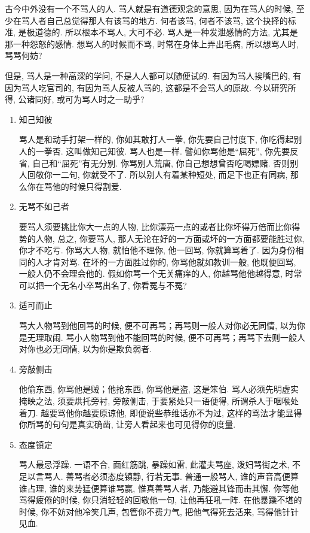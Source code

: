 
古今中外没有一个不骂人的人. 骂人就是有道德观念的意思, 因为在骂人的时候, 至少在骂人者自己总觉得那人有该骂的地方. 何者该骂, 何者不该骂, 这个抉择的标准, 是极道德的. 所以根本不骂人, 大可不必. 骂人是一种发泄感情的方法, 尤其是那一种怨怒的感情. 想骂人的时候而不骂, 时常在身体上弄出毛病, 所以想骂人时, 骂骂何妨? 

但是, 骂人是一种高深的学问, 不是人人都可以随便试的. 有因为骂人挨嘴巴的, 有因为骂人吃官司的, 有因为骂人反被人骂的, 这都是不会骂人的原故. 今以研究所得, 公诸同好, 或可为骂人时之一助乎? 

\begin{enumerate}

\item 知己知彼

骂人是和动手打架一样的, 你如其敢打人一拳, 你先要自己忖度下, 你吃得起别人的一拳否. 这叫做知己知彼. 骂人也是一样. 譬如你骂他是“屈死”, 你先要反省, 自己和“屈死”有无分别. 你骂别人荒唐, 你自己想想曾否吃喝嫖赌. 否则别人回敬你一二句, 你就受不了. 所以别人有着某种短处, 而足下也正有同病, 那么你在骂他的时候只得割爱. 

\item 无骂不如己者

要骂人须要挑比你大一点的人物, 比你漂亮一点的或者比你坏得万倍而比你得势的人物, 总之, 你要骂人, 那人无论在好的一方面或坏的一方面都要能胜过你, 你才不吃亏. 你骂大人物, 就怕他不理你, 他一回骂, 你就算骂着了. 因为身份相同的人才肯对骂. 在坏的一方面胜过你的, 你骂他就如教训一般, 他既便回骂, 一般人仍不会理会他的. 假如你骂一个无关痛痒的人, 你越骂他他越得意, 时常可以把一个无名小卒骂出名了, 你看冤与不冤? 

\item 适可而止

骂大人物骂到他回骂的时候, 便不可再骂；再骂则一般人对你必无同情, 以为你是无理取闹. 骂小人物骂到他不能回骂的时候, 便不可再骂；再骂下去则一般人对你也必无同情, 以为你是欺负弱者. 

\item 旁敲侧击

他偷东西, 你骂他是贼；他抢东西, 你骂他是盗, 这是笨伯. 骂人必须先明虚实掩映之法, 须要烘托旁衬, 旁敲侧击, 于要紧处只一语便得, 所谓杀人于咽喉处着刀. 越要骂他你越要原谅他, 即便说些恭维话亦不为过, 这样的骂法才能显得你所骂的句句是真实确凿, 让旁人看起来也可见得你的度量. 

\item 态度镇定

骂人最忌浮躁. 一语不合, 面红筋跳, 暴躁如雷, 此灌夫骂座, 泼妇骂街之术, 不足以言骂人. 善骂者必须态度镇静, 行若无事. 普通一般骂人, 谁的声音高便算谁占理, 谁的来势猛便算谁骂赢, 惟真善骂人者, 乃能避其锋而击其懈. 你等他骂得疲倦的时候, 你只消轻轻的回敬他一句, 让他再狂吼一阵. 在他暴躁不堪的时候, 你不妨对他冷笑几声, 包管你不费力气, 把他气得死去活来, 骂得他针针见血. 


\end{enumerate}
